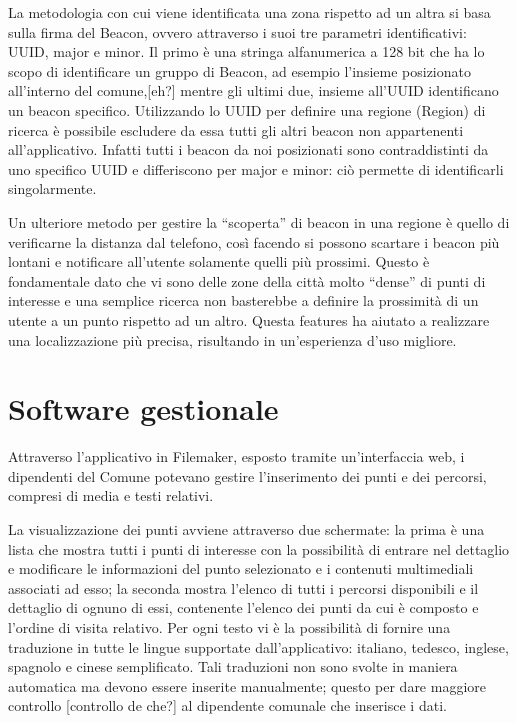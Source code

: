 La metodologia con cui viene identificata una zona rispetto ad un altra si basa sulla firma del Beacon, ovvero attraverso i suoi tre parametri identificativi: UUID, major e minor. Il primo è una stringa alfanumerica a 128 bit che ha lo scopo di identificare un gruppo di Beacon, ad esempio l’insieme posizionato all’interno del comune,[eh?] mentre gli ultimi due, insieme all’UUID identificano un beacon specifico. Utilizzando lo UUID per definire una regione (Region) di ricerca è possibile escludere da essa tutti gli altri beacon non appartenenti all’applicativo. Infatti tutti i beacon da noi posizionati sono contraddistinti da uno specifico UUID e differiscono per major e minor: ciò permette di identificarli singolarmente. \vspace{5mm}

Un ulteriore metodo per gestire la “scoperta” di beacon in una regione è quello di verificarne la distanza dal telefono, così facendo si possono scartare i beacon più lontani e notificare all’utente solamente quelli più prossimi. Questo è fondamentale dato che vi sono delle zone della città molto “dense” di punti di interesse e una semplice ricerca non basterebbe a definire la prossimità di un utente a un punto rispetto ad un altro. Questa features ha aiutato a realizzare una localizzazione più precisa, risultando in un’esperienza d’uso migliore.\vspace{5mm}

\section{Software gestionale}\vspace{5mm}

	Attraverso l’applicativo in Filemaker, esposto tramite un’interfaccia web, i dipendenti del Comune potevano gestire l’inserimento dei punti e dei percorsi, compresi di media e testi relativi. \vspace{5mm}
	
La visualizzazione dei punti avviene attraverso due schermate: la prima è una lista che mostra tutti i punti di interesse con la possibilità di entrare nel dettaglio e modificare le informazioni del punto selezionato e i contenuti multimediali associati ad esso; la seconda mostra l'elenco di tutti i percorsi disponibili e il dettaglio di ognuno di essi, contenente l'elenco dei punti da cui è composto e l'ordine di visita relativo. Per ogni testo vi è la possibilità di fornire una traduzione in tutte le lingue supportate dall'applicativo: italiano, tedesco, inglese, spagnolo e cinese semplificato. Tali traduzioni non sono svolte in maniera automatica ma devono essere inserite manualmente; questo per dare maggiore controllo [controllo de che?] al dipendente comunale che inserisce i dati.\vspace{5mm}

